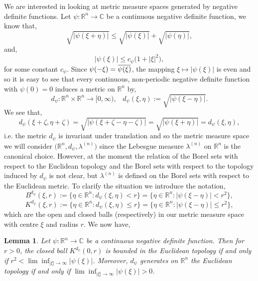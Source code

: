 \documentclass[a4paper, 12pt]{report}
\newtheorem{lemma}[theorem]{Lemma}
\theoremstyle{remark}
\theoremstyle{definition}
\newcommand{\overbar}[1]{\mkern 1.5mu\overline{\mkern-1.5mu#1\mkern-1.5mu}\mkern 1.5mu}
\begin{document}
We are interested in looking at metric measure spaces generated by negative definite functions.  Let $\psi : \mathbb{R}^n \to \mathbb{C}$ be a continuous negative definite function, we know that,
$$
\sqrt{|\psi(\xi + \eta)|} \le \sqrt{|\psi(\xi)|} + \sqrt{|\psi(\eta)|},
$$
and,
$$
|\psi(\xi)| \le c_\psi\big(1 + |\xi|^2\big),
$$
for some constant $c_\psi$.  Since $\psi(-\xi) = \overbar{\psi(\xi)}$, the mapping $\xi \mapsto |\psi(\xi)|$ is even and so it is easy to see that every continuous, non-periodic negative definite function with $\psi(0) = 0$ induces a metric on $\mathbb{R}^n$ by,
$$
d_\psi : \mathbb{R}^n \times \mathbb{R}^n \to [0, \infty), \,\,\,\,\, d_\psi(\xi, \eta) := \sqrt{|\psi(\xi - \eta)|}.
$$
We see that,
$$
d_\psi(\xi + \zeta, \eta + \zeta) = \sqrt{|\psi(\xi + \zeta - \eta - \zeta)|} = \sqrt{|\psi(\xi + \eta)|} = d_\psi(\xi, \eta),
$$
i.e. the metric $d_\psi$ is invariant under translation and so the metric measure space we will consider $\big(\mathbb{R}^n, d_\psi, \lambda^{(n)}\big)$ since the Lebesgue measure $\lambda^{(n)}$ on $\mathbb{R}^n$ is the canonical choice.  However, at the moment the relation of the Borel sets with respect to the Euclidean topology and the Borel sets with respect to the topology induced by $d_\psi$ is not clear, but $\lambda^{(n)}$ is defined on the Borel sets with respect to the Euclidean metric.  To clarify the situation we introduce the notation,
$$
B^{d_\psi}(\xi, r) := \{\eta \in \mathbb{R}^n : d_\psi(\xi, \eta) < r\} = \{\eta \in \mathbb{R}^n : |\psi(\xi - \eta)| < r^2\},
$$
$$
K^{d_\psi}(\xi, r) := \{\eta \in \mathbb{R}^n : d_\psi(\xi, \eta) \le r\} = \{\eta \in \mathbb{R}^n : |\psi(\xi - \eta)| \le r^2\},
$$
which are the open and closed balls (respectively) in our metric measure space with centre $\xi$ and radius $r$.  We now have,
\begin{lemma}
Let $\psi : \mathbb{R}^n \to \mathbb{C}$ be a continuous negative definite function.  Then for $r > 0$, the closed ball $K^{d_\psi}(0, r)$ is bounded in the Euclidean topology if and only if $r^2 < \lim\inf_{|\xi| \to \infty}|\psi(\xi)|$.  Moreover, $d_\psi$ generates on $\mathbb{R}^n$ the Euclidean topology if and only if $\lim\inf_{|\xi| \to \infty}|\psi(\xi)| > 0$.
\end{lemma}
\end{document}
